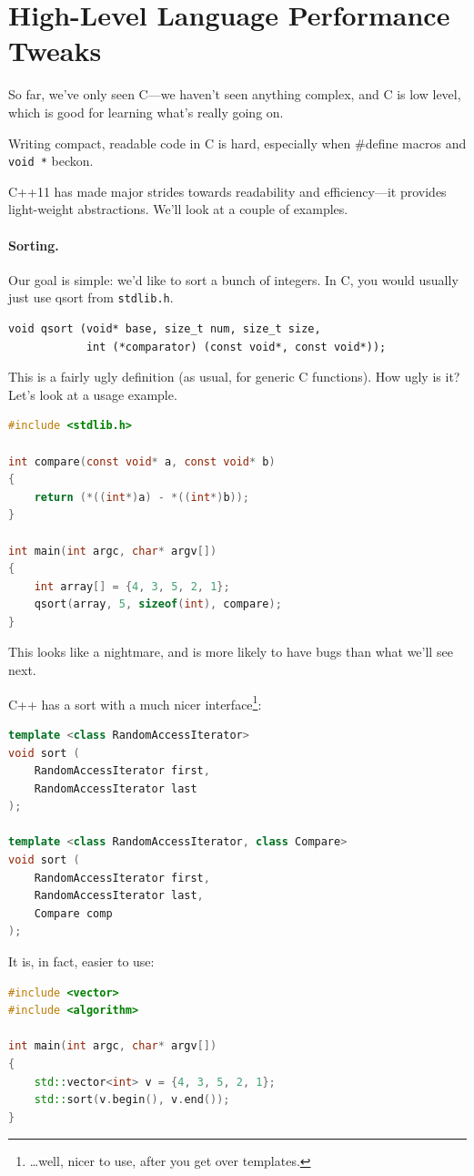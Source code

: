 \documentclass[a4paper]{report}
\begin{document}
\section*{High-Level Language Performance Tweaks}
So far, we've only seen C---we haven't seen anything complex, and C is
low level, which is good for learning what's really going on.

 Writing compact, readable code in C is hard, especially when \#define
macros and {\tt void *} beckon.

    C++11 has made major strides towards readability and
    efficiency---it provides light-weight abstractions. We'll look at
    a couple of examples.

\paragraph{Sorting.} Our goal is simple: we'd like to sort a bunch of integers.
In C, you would usually just use qsort from {\tt stdlib.h}.

  \begin{lstlisting}
void qsort (void* base, size_t num, size_t size,
            int (*comparator) (const void*, const void*));
  \end{lstlisting}

This is a fairly ugly definition (as usual, for generic C functions). How ugly is it?
Let's look at a usage example.
  \begin{lstlisting}[language=C]
#include <stdlib.h>

int compare(const void* a, const void* b)
{
    return (*((int*)a) - *((int*)b));
}

int main(int argc, char* argv[])
{
    int array[] = {4, 3, 5, 2, 1};
    qsort(array, 5, sizeof(int), compare);
}
  \end{lstlisting}
This looks like a nightmare, and is more likely to have bugs than what we'll see next.


C++ has a sort with a much nicer interface\footnote{\ldots well, nicer to use, after you get over templates.}:

  \begin{lstlisting}[language=C++]
template <class RandomAccessIterator>
void sort (
    RandomAccessIterator first,
    RandomAccessIterator last
);

template <class RandomAccessIterator, class Compare>
void sort (
    RandomAccessIterator first,
    RandomAccessIterator last,
    Compare comp
);
  \end{lstlisting}
It is, in fact, easier to use:
  \begin{lstlisting}[language=C++]
#include <vector>
#include <algorithm>

int main(int argc, char* argv[])
{
    std::vector<int> v = {4, 3, 5, 2, 1};
    std::sort(v.begin(), v.end());
}
  \end{lstlisting}
\end{document}
